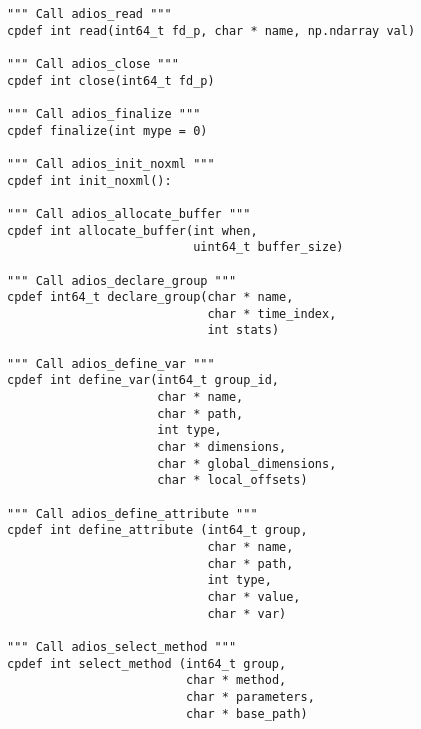 \begin{lstlisting}[language=cython,frame=single, backgroundcolor=\color{gray85},caption={Functions for writing and No-XML},label={},]
""" Call adios_read """
cpdef int read(int64_t fd_p, char * name, np.ndarray val)

""" Call adios_close """
cpdef int close(int64_t fd_p)

""" Call adios_finalize """
cpdef finalize(int mype = 0)

""" Call adios_init_noxml """
cpdef int init_noxml():

""" Call adios_allocate_buffer """
cpdef int allocate_buffer(int when,
                          uint64_t buffer_size)

""" Call adios_declare_group """
cpdef int64_t declare_group(char * name,
                            char * time_index,
                            int stats)

""" Call adios_define_var """
cpdef int define_var(int64_t group_id,
                     char * name,
                     char * path,
                     int type,
                     char * dimensions,
                     char * global_dimensions,
                     char * local_offsets)

""" Call adios_define_attribute """
cpdef int define_attribute (int64_t group,
                            char * name,
                            char * path,
                            int type,
                            char * value,
                            char * var)

""" Call adios_select_method """
cpdef int select_method (int64_t group,
                         char * method,
                         char * parameters,
                         char * base_path)
\end{lstlisting}

